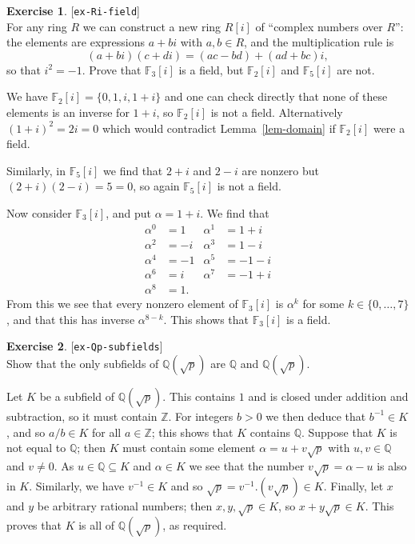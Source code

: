 \documentclass{amsart}
\newcommand{\Z}         {{\mathbb{Z}}}
\newcommand{\Q}         {{\mathbb{Q}}}
\newcommand{\F}         {{\mathbb{F}}}
\newcommand{\al}        {\alpha}
\newcommand{\sse}       {\subseteq}
\renewcommand{\:}{\colon}
\newcommand{\lastexlabel}{}
\newcommand{\exlabel}[1]{
 \global\def\lastexlabel{#1}\label{#1}[\texttt{#1}]\ \\
}
\newcommand{\exlabel}[1]{
 \global\def\lastexlabel{#1}\label{#1}
}
\newenvironment{solution}{\SolutionInline}{\endSolutionInline}
\theoremstyle{definition}
\newtheorem{exercise}{Exercise}[section]
\renewenvironment{solution}{\SolutionAtEnd}{\endSolutionAtEnd}
\begin{document}
\begin{exercise}\exlabel{ex-Ri-field}
 For any ring $R$ we can construct a new ring $R[i]$ of ``complex
 numbers over $R$'': the elements are expressions $a+bi$ with
 $a,b\in R$, and the multiplication rule is 
 \[ (a+bi)(c+di) = (ac-bd)+(ad+bc)i, \]
 so that $i^2=-1$.  Prove that $\F_3[i]$ is a field, but $\F_2[i]$ and
 $\F_5[i]$ are not.
\end{exercise}
\begin{solution}
 We have $\F_2[i]=\{0,1,i,1+i\}$ and one can check directly that none
 of these elements is an inverse for $1+i$, so $\F_2[i]$ is not a
 field.  Alternatively $(1+i)^2=2i=0$ which would contradict
 Lemma~\ref{lem-domain} if $\F_2[i]$ were a field.

 Similarly, in $\F_5[i]$ we find that $2+i$ and $2-i$ are nonzero but
 $(2+i)(2-i)=5=0$, so again $\F_5[i]$ is not a field.

 Now consider $\F_3[i]$, and put $\al=1+i$.  We find that 
 \begin{align*}
  \al^0 &= 1 & \al^1 &= 1+i \\
  \al^2 &= -i & \al^3 &= 1-i \\
  \al^4 &= -1 & \al^5 &= -1-i \\
  \al^6 &= i & \al^7 &= -1+i \\
  \al^8 &= 1.
 \end{align*}
 From this we see that every nonzero element of $\F_3[i]$ is $\al^k$
 for some $k\in\{0,\dotsc,7\}$, and that this has inverse
 $\al^{8-k}$.  This shows that $\F_3[i]$ is a field.
\end{solution}
\begin{exercise}\exlabel{ex-Qp-subfields}
 Show that the only subfields of $\Q(\sqrt{p})$ are $\Q$ and
 $\Q(\sqrt{p})$.  
\end{exercise}
\begin{solution}
 Let $K$ be a subfield of $\Q(\sqrt{p})$.  This contains $1$ and is
 closed under addition and subtraction, so it must contain $\Z$.  For
 integers $b>0$ we then deduce that $b^{-1}\in K$, and so $a/b\in K$
 for all $a\in\Z$; this shows that $K$ contains $\Q$.  Suppose that
 $K$ is not equal to $\Q$; then $K$ must contain some element
 $\al=u+v\sqrt{p}$ with $u,v\in\Q$ and $v\neq 0$.  As $u\in\Q\sse K$
 and $\al\in K$ we see that the number $v\sqrt{p}=\al-u$ is also in
 $K$.  Similarly, we have $v^{-1}\in K$ and so
 $\sqrt{p}=v^{-1}.(v\sqrt{p})\in K$.  Finally, let $x$ and $y$ be
 arbitrary rational numbers; then $x,y,\sqrt{p}\in K$, so
 $x+y\sqrt{p}\in K$.  This proves that $K$ is all of $\Q(\sqrt{p})$,
 as required.
\end{solution}
\end{document}
